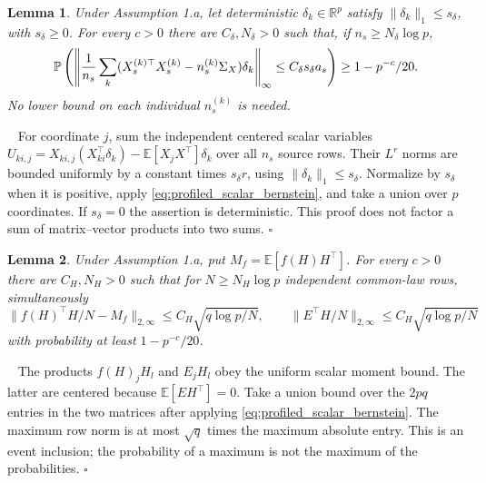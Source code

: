 \documentclass[12pt]{article}
\newtheorem{lemma}{Lemma}
\newenvironment{pf}{{\noindent \it Proof}\ }{\hfill $\square$\par}
\begin{document}
\begin{lemma}
\label{lem:error_sample_covariance_sparse}
Under Assumption 1.a, let deterministic $\delta_k\in\mathbb R^p$ satisfy
$\|\delta_k\|_1\le s_\delta$, with $s_\delta\ge0$.
For every $c>0$ there are $C_\delta,N_\delta>0$ such that,
if $n_s\ge N_\delta\log p$,
\[
 \mathbb P\left(\left\|{1\over n_s}\sum_k
 (X_s^{(k)\top}X_s^{(k)}-n_s^{(k)}\Sigma_X)\delta_k
 \right\|_\infty\le C_\delta s_\delta a_s\right)\ge1-p^{-c}/20.
\]
No lower bound on each individual $n_s^{(k)}$ is needed.
\end{lemma}
\begin{pf}
For coordinate $j$, sum the independent centered scalar variables
$U_{ki,j}=X_{ki,j}(X_{ki}^\top\delta_k)-
\mathbb E[X_jX^\top]\delta_k$ over all $n_s$ source rows.
Their $L^r$ norms are bounded uniformly by a constant times
$s_\delta r$, using $\|\delta_k\|_1\le s_\delta$.
Normalize by $s_\delta$ when it is positive, apply
\eqref{eq:profiled_scalar_bernstein}, and take a union over $p$ coordinates.
If $s_\delta=0$ the assertion is deterministic.
This proof does not factor a sum of matrix--vector products into two sums.
\end{pf}

\begin{lemma}
\label{lem:error_sample_covariance2}
Under Assumption 1.a, put $M_f=\mathbb E[f(H)H^\top]$.
For every $c>0$ there are $C_H,N_H>0$ such that for
$N\ge N_H\log p$ independent common-law rows, simultaneously
\[
 \|f(H)^\top H/N-M_f\|_{2,\infty}
       \le C_H\sqrt{q\log p/N},\qquad
 \|E^\top H/N\|_{2,\infty}\le C_H\sqrt{q\log p/N}
\]
with probability at least $1-p^{-c}/20$.
\end{lemma}
\begin{pf}
The products $f(H)_jH_l$ and $E_jH_l$ obey the uniform scalar moment
bound. The latter are centered because $\mathbb E[EH^\top]=0$.
Take a union bound over the $2pq$ entries in the two matrices after applying
\eqref{eq:profiled_scalar_bernstein}. The maximum row norm is at most
$\sqrt q$ times the maximum absolute entry. This is an event inclusion;
the probability of a maximum is not the maximum of the probabilities.
\end{pf}
\end{document}
